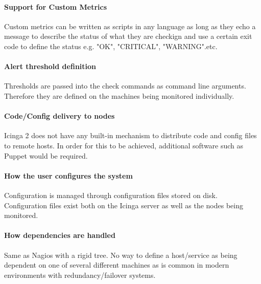 \documentclass[10pt]{article}
\begin{document}
	\paragraph{Support for Custom Metrics}
	Custom metrics can be written as scripts in any language as long as they echo a message to describe
	the status of what they are checkign and use a certain exit code to define the status e.g. "OK",
	"CRITICAL", "WARNING".etc.
	
	\paragraph{Alert threshold definition}
	Thresholds are passed into the check commands as command line arguments.  Therefore they are defined
	on the machines being monitored individually.
	
	\paragraph{Code/Config delivery to nodes}
	Icinga 2 does not have any built-in mechanism to distribute code and config files to remote hosts.
	In order for this to be achieved, additional software such as Puppet would be required.
	
	\paragraph{How the user configures the system}
	Configuration is managed through configuration files stored on disk.  Configuration files exist both
	on the Icinga server as well as the nodes being monitored.
	
	\paragraph{How dependencies are handled}
	Same as Nagios with a rigid tree.  No way to define a host/service as being dependent on one of 
	several different machines as is common in modern environments with redundancy/failover systems.
\end{document}
